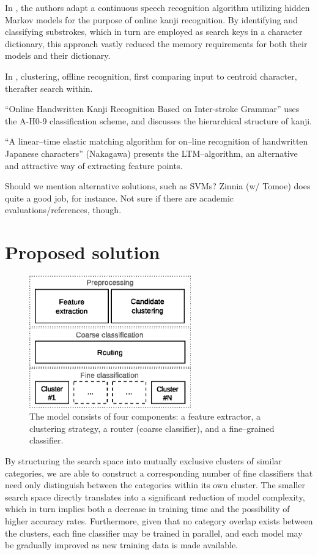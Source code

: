 \documentclass[10pt,conference,a4paper]{IEEEtran}
\begin{document}
	In \cite{nakai2001substroke}, the authors adapt a continuous speech recognition algorithm utilizing
	hidden Markov models for the purpose of online kanji recognition. By identifying and classifying
	substrokes, which in turn are employed as search keys in a character dictionary, this approach vastly
	reduced the memory requirements for both their models and their dictionary.

	
	In \cite{yang2003accelerating}, clustering, offline recognition, first comparing input to centroid character,
	therafter search within.


	``Online Handwritten Kanji Recognition Based on Inter-stroke Grammar'' uses the A-H0-9 classification scheme,
	and discusses the hierarchical structure of kanji.

	``A linear--time elastic matching algorithm for on--line recognition of handwritten Japanese characters'' (Nakagawa)
	presents the LTM--algorithm, an alternative and attractive way of extracting feature points.

	Should we mention alternative solutions, such as SVMs? Zinnia (w/ Tomoe) does quite a good job, for instance. Not sure if there
	are academic evaluations/references, though.



	\section{Proposed solution}

	\begin{figure}
		\centering
		\includegraphics[width=2.75in]{./fig/model-overview.eps}
		\caption{The model consists of four components: a feature extractor, a clustering strategy,
			a router (coarse classifier), and a fine--grained classifier.}
		\label{fig_model_overview}
	\end{figure}



	By structuring the search space into mutually exclusive clusters of similar categories,
	we are able to construct a corresponding number of fine classifiers that need only distinguish
	between the categories within its own cluster. The smaller search space directly translates into a
	significant reduction of model complexity, which in turn implies both a decrease in training time
	and the possibility of higher accuracy rates. Furthermore, given that no category overlap exists
	between the clusters, each fine classifier may be trained in parallel, and each model may be gradually
	improved as new training data is made available.
\end{document}
